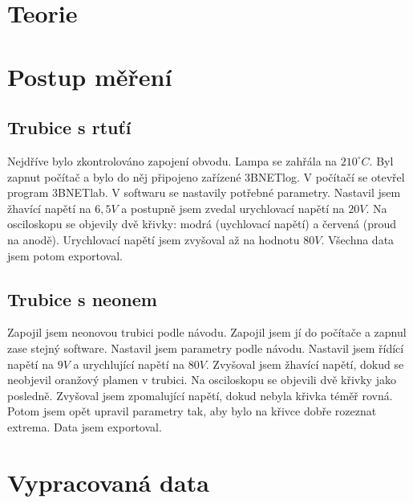 \documentclass{article}
\begin{document}
\section{Teorie}
\section{Postup měření}
\subsection{Trubice s rtuťí}
Nejdříve bylo zkontrolováno zapojení obvodu.
Lampa se zahřála na $210 ^{\circ} C$. Byl zapnut počítač a bylo do něj připojeno zařízené 3BNETlog.
V počítačí se otevřel program 3BNETlab. V softwaru se nastavily potřebné parametry.
Nastavil jsem žhavící napětí na $6,5 V$ a postupně jsem zvedal urychlovací napětí na $20V$.
Na osciloskopu se objevily dvě křivky: modrá (uychlovací napětí) a červená (proud na anodě).
Urychlovací napětí jsem zvyšoval až na hodnotu $80V$.
Všechna data jsem potom exportoval.
\subsection{Trubice s neonem}
Zapojil jsem neonovou trubici podle návodu.
Zapojil jsem jí do počítače a zapnul zase stejný software.
Nastavil jsem parametry podle návodu.
Nastavil jsem řídící napětí na $9V$ a urychlující napětí na $80V$.
Zvyšoval jsem žhavící napětí, dokud se neobjevil oranžový plamen v trubici.
Na osciloskopu se objevili dvě křivky jako posledně.
Zvyšoval jsem zpomalující napětí, dokud nebyla křivka téměř rovná.
Potom jsem opět upravil parametry tak, aby bylo na křivce dobře rozeznat extrema.
Data jsem exportoval.
\section{Vypracovaná data}
\end{document}
